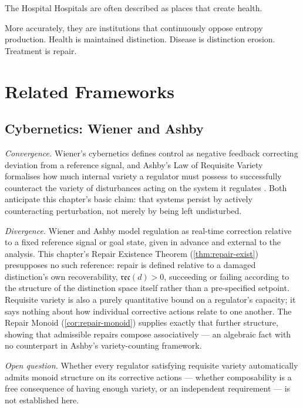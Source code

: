 \documentclass[12pt,twoside,openright]{book}
\newcommand{\reco}{\mathfrak{rec}}
\begin{document}
\begin{repairaside}{The Hospital}
Hospitals are often described as places that create health.

More accurately, they are institutions that continuously
oppose entropy production. Health is maintained distinction.
Disease is distinction erosion. Treatment is repair.
\end{repairaside}

\section{Related Frameworks}
\label{sec:ch7-related-frameworks}

\subsection*{Cybernetics: Wiener and Ashby}

\emph{Convergence.} Wiener's cybernetics defines control as
negative feedback correcting deviation from a reference signal,
and Ashby's Law of Requisite Variety formalises how much
internal variety a regulator must possess to successfully
counteract the variety of disturbances acting on the system it
regulates \parencite{wiener1948,ashby1956}. Both anticipate this
chapter's basic claim: that systems persist by actively
counteracting perturbation, not merely by being left undisturbed.

\emph{Divergence.} Wiener and Ashby model regulation as
real-time correction relative to a fixed reference signal or
goal state, given in advance and external to the analysis. This
chapter's Repair Existence Theorem (\cref{thm:repair-exist})
presupposes no such reference: repair is defined relative to a
damaged distinction's own recoverability, $\reco(d) > 0$,
succeeding or failing according to the structure of the
distinction space itself rather than a pre-specified setpoint.
Requisite variety is also a purely quantitative bound on a
regulator's capacity; it says nothing about how individual
corrective actions relate to one another. The Repair Monoid
(\cref{cor:repair-monoid}) supplies exactly that further
structure, showing that admissible repairs compose
associatively --- an algebraic fact with no counterpart in
Ashby's variety-counting framework.

\emph{Open question.} Whether every regulator satisfying
requisite variety automatically admits monoid structure on its
corrective actions --- whether composability is a free
consequence of having enough variety, or an independent
requirement --- is not established here.
\end{document}
